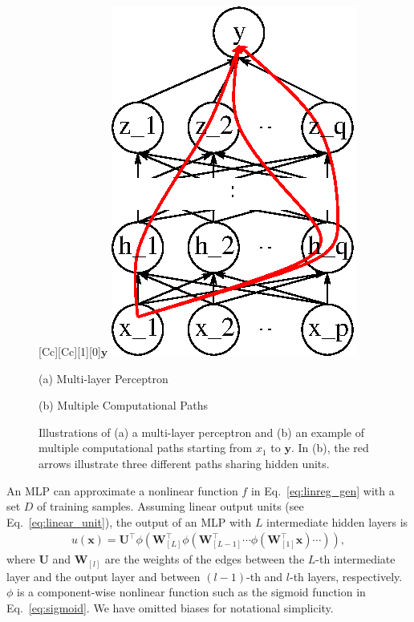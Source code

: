 \documentclass[dissertation,nocontribution,draft*]{aaltoseries}
\newcommand{\qlay}[1]{\left[#1\right]}
\newcommand{\vect}[1]{\mathbf{#1}}
\newcommand{\matr}[1]{\mathbf{#1}}
\newcommand{\vx}[0]{\vect{x}}
\newcommand{\vy}[0]{\vect{y}}
\newcommand{\mW}[0]{\matr{W}}
\newcommand{\mU}[0]{\matr{U}}
\begin{document}
\begin{figure}[t]
\begin{minipage}{0.48\textwidth}
        [Cc][Cc][1][0]{$\vy$}
        \includegraphics[width=0.75\columnwidth]{figures/mlp_multicomp.eps}
    \end{minipage}

    \vspace{2mm}
    \begin{minipage}{0.48\textwidth}
        \centering
        \small
        (a) Multi-layer Perceptron
    \end{minipage}
    \begin{minipage}{0.48\textwidth}
        \centering
        \small
        (b) Multiple Computational Paths
    \end{minipage}
    \caption{Illustrations of (a) a multi-layer perceptron
    and (b) an example of multiple computational paths
    starting from $x_1$ to $\vy$. In (b), the red arrows
    illustrate three different paths sharing hidden units.}
    \label{fig:mlp}
\end{figure}

An MLP can approximate a nonlinear function
$f$ in Eq.~\eqref{eq:linreg_gen} with a set $D$ of training
samples. Assuming linear output units (see
Eq.~\eqref{eq:linear_unit}), the output of an MLP with $L$
intermediate hidden layers is
\begin{align*}
    u(\vx) = \mU^\top \phi \left( \mW_{\qlay{L}}^\top \phi \left(
    \mW_{\qlay{L-1}}^\top \cdots \phi \left( \mW_{\qlay{1}}^\top \vx \right)
    \cdots \right) \right),
\end{align*}
where $\mU$ and $\mW_{\qlay{l}}$ are the weights of the edges between
the $L$-th intermediate layer and the output layer and
between $(l-1)$-th and $l$-th layers, respectively. $\phi$
is a component-wise nonlinear function such as the sigmoid
function in Eq.~\eqref{eq:sigmoid}. 
We have omitted biases for notational simplicity.
\end{document}
